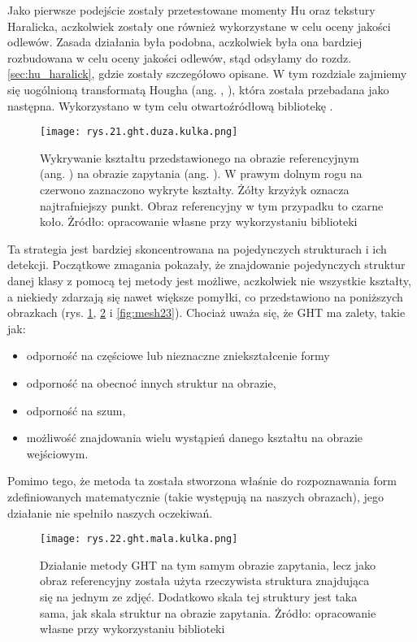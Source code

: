 Jako pierwsze podejście zostały przetestowane momenty Hu oraz tekstury Haralicka, aczkolwiek zostały one również wykorzystane w celu oceny jakości odlewów. Zasada działania była podobna, aczkolwiek była ona bardziej rozbudowana w celu oceny jakości odlewów, stąd odsyłamy do rozdz. \ref{sec:hu_haralick}, gdzie zostały szczegółowo opisane. W tym rozdziale zajmiemy się uogólnioną transformatą Hougha (ang. , ), która została przebadana jako następna. Wykorzystano w tym celu otwartoźródłową bibliotekę . 
\begin{figure}[h]
    \centering
    \texttt{[image: rys.21.ght.duza.kulka.png]}
    \caption{Wykrywanie kształtu przedstawionego na obrazie referencyjnym (ang. ) na obrazie zapytania (ang. ). W prawym dolnym rogu na czerwono zaznaczono wykryte kształty. Żółty krzyżyk oznacza najtrafniejszy punkt. Obraz referencyjny w tym przypadku to czarne koło. Żródło: opracowanie własne przy wykorzystaniu biblioteki }
    \label{fig:mesh21}
\end{figure}
Ta strategia jest bardziej skoncentrowana na pojedynczych strukturach i ich detekcji. Początkowe zmagania pokazały, że znajdowanie pojedynczych struktur danej klasy z pomocą tej metody jest możliwe, aczkolwiek nie wszystkie kształty, a niekiedy zdarzają się nawet większe pomyłki, co przedstawiono na poniższych obrazkach (rys. \ref{fig:mesh21}, \ref{fig:mesh22} i \ref{fig:mesh23}). Chociaż uważa się, że GHT ma zalety, takie jak:
\begin{itemize}
	\item odporność na częściowe lub nieznaczne zniekształcenie formy
	\item odporność na obecnoć innych struktur na obrazie,
	\item odporność na szum,
	\item możliwość znajdowania wielu wystąpień danego kształtu na obrazie wejściowym.
\end{itemize}
Pomimo tego, że metoda ta została stworzona właśnie do rozpoznawania form zdefiniowanych matematycznie (takie występują na naszych obrazach), jego działanie nie spełniło naszych oczekiwań.
\begin{figure}[h]
    \centering
    \texttt{[image: rys.22.ght.mala.kulka.png]}
    \caption{Działanie metody GHT na tym samym obrazie zapytania, lecz jako obraz referencyjny została użyta rzeczywista struktura znajdująca się na jednym ze zdjęć. Dodatkowo skala tej struktury jest taka sama, jak skala struktur na obrazie zapytania. Żródło: opracowanie własne przy wykorzystaniu biblioteki }
    \label{fig:mesh22}
\end{figure}

